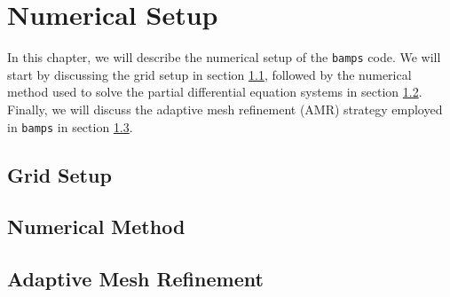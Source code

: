 
\chapter{Numerical Setup}
\label{chapter:numerical_setup}

In this chapter, we will describe the numerical setup of the \texttt{bamps} code. We will start by discussing the grid setup in section \ref{section:grid}, followed by the numerical method used to solve the partial differential equation systems in section \ref{section:Numerical_Method}. Finally, we will discuss the adaptive mesh refinement (AMR) strategy employed in \texttt{bamps} in section \ref{section:amr}.

\section{Grid Setup}
\label{section:grid}


\section{Numerical Method}
\label{section:Numerical_Method}


\section{Adaptive Mesh Refinement}
\label{section:amr}